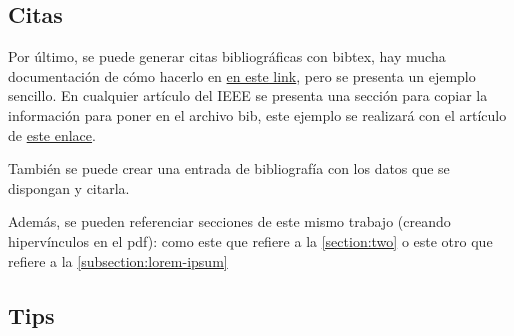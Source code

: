 \subsection{Citas}

Por último, se puede generar citas bibliográficas con bibtex, hay mucha documentación de cómo hacerlo en \href{https://www.overleaf.com/learn/latex/Bibliography_management_with_bibtex}{en este link}, pero se presenta un ejemplo sencillo. En cualquier artículo del IEEE se presenta una sección para copiar la información para poner en el archivo bib, este ejemplo se realizará con el artículo de \href{https://ieeexplore.ieee.org/document/8310054}{este enlace}. \cite{8310054}

También se puede crear una entrada de bibliografía con los datos que se dispongan y citarla. \cite{ea3_2023}

Además, se pueden referenciar secciones de este mismo trabajo (creando hipervínculos en el pdf): como este que refiere a la \autoref{section:two} o este otro que refiere a la \autoref{subsection:lorem-ipsum}

\subsection{Tips}

